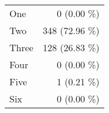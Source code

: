 \begin{tabular}{ l  r }
One & 0 (0.00 \%)\\
Two & 348 (72.96 \%)\\
Three & 128 (26.83 \%)\\
Four & 0 (0.00 \%)\\
Five & 1 (0.21 \%)\\
Six & 0 (0.00 \%)\\
\end{tabular}